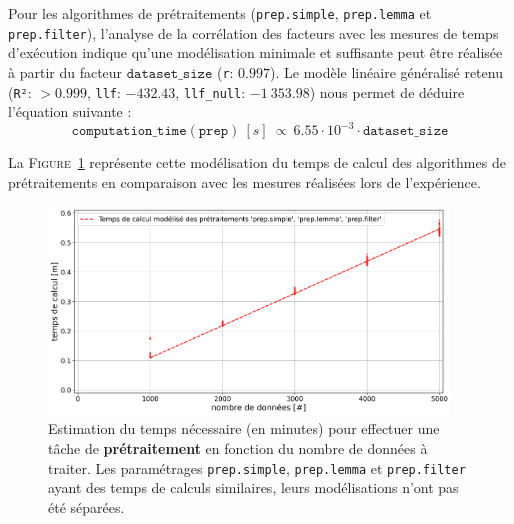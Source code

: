 			Pour les algorithmes de prétraitements (\texttt{prep.simple}, \texttt{prep.lemma} et \texttt{prep.filter}), l'analyse de la corrélation des facteurs avec les mesures de temps d'exécution indique qu'une modélisation minimale et suffisante peut être réalisée à partir du facteur $\texttt{dataset\_size}$ (\texttt{r}: $0.997$).
			Le modèle linéaire généralisé retenu (\texttt{R²}: $> 0.999$, \texttt{llf}: $-432.43$, \texttt{llf\_null}: $-1~353.98$) nous permet de déduire l'équation suivante :
			\begin{equation}
				\texttt{computation\_time}(\texttt{prep})~[s]~
				\propto~6.55 \cdot 10^{-3} \cdot \texttt{dataset\_size}
			\end{equation}
			
			La \textsc{Figure~\ref{figure:4.3.2-ETUDE-COUTS-TEMPS-CALCUL-MODELISATION-PREPROCESSING}} représente cette modélisation du temps de calcul des algorithmes de prétraitements en comparaison avec les mesures réalisées lors de l'expérience.
			\newline
			\begin{figure}[!htb]
				\centering
				\includegraphics[width=0.95\textwidth]{figures/etude-temps-calcul-modelisation-1prep}
				\caption{
					Estimation du temps nécessaire (en minutes) pour effectuer une tâche de \textbf{prétraitement} en fonction du nombre de données à traiter. Les paramétrages \texttt{prep.simple}, \texttt{prep.lemma} et \texttt{prep.filter} ayant des temps de calculs similaires, leurs modélisations n'ont pas été séparées.
				}
				\label{figure:4.3.2-ETUDE-COUTS-TEMPS-CALCUL-MODELISATION-PREPROCESSING}
			\end{figure}
			
			
